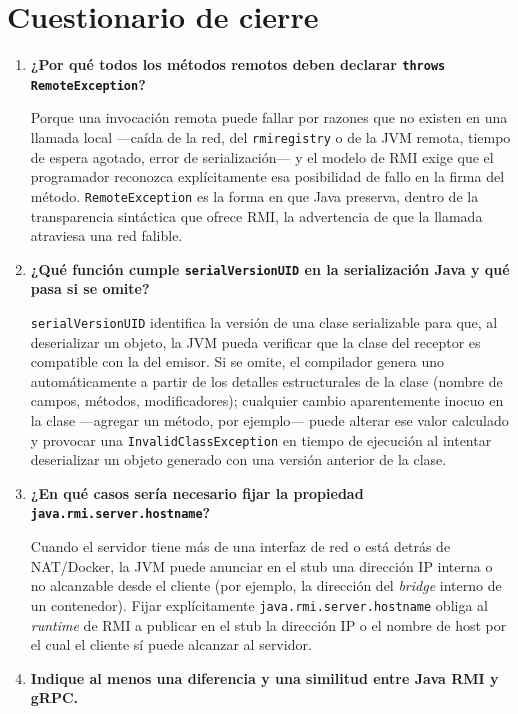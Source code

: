 \section{Cuestionario de cierre}

\begin{enumerate}[label=\arabic*.]

\item \textbf{¿Por qué todos los métodos remotos deben declarar \texttt{throws RemoteException}?}

Porque una invocación remota puede fallar por razones que no existen en una llamada local —caída de la red, del \texttt{rmiregistry} o de la JVM remota, tiempo de espera agotado, error de serialización— y el modelo de RMI exige que el programador reconozca explícitamente esa posibilidad de fallo en la firma del método. \texttt{RemoteException} es la forma en que Java preserva, dentro de la transparencia sintáctica que ofrece RMI, la advertencia de que la llamada atraviesa una red falible.

\item \textbf{¿Qué función cumple \texttt{serialVersionUID} en la serialización Java y qué pasa si se omite?}

\texttt{serialVersionUID} identifica la versión de una clase serializable para que, al deserializar un objeto, la JVM pueda verificar que la clase del receptor es compatible con la del emisor. Si se omite, el compilador genera uno automáticamente a partir de los detalles estructurales de la clase (nombre de campos, métodos, modificadores); cualquier cambio aparentemente inocuo en la clase —agregar un método, por ejemplo— puede alterar ese valor calculado y provocar una \texttt{InvalidClassException} en tiempo de ejecución al intentar deserializar un objeto generado con una versión anterior de la clase.

\item \textbf{¿En qué casos sería necesario fijar la propiedad \texttt{java.rmi.server.hostname}?}

Cuando el servidor tiene más de una interfaz de red o está detrás de NAT/Docker, la JVM puede anunciar en el stub una dirección IP interna o no alcanzable desde el cliente (por ejemplo, la dirección del \emph{bridge} interno de un contenedor). Fijar explícitamente \texttt{java.rmi.server.hostname} obliga al \emph{runtime} de RMI a publicar en el stub la dirección IP o el nombre de host por el cual el cliente sí puede alcanzar al servidor.

\item \textbf{Indique al menos una diferencia y una similitud entre Java RMI y gRPC.}


\end{enumerate}
